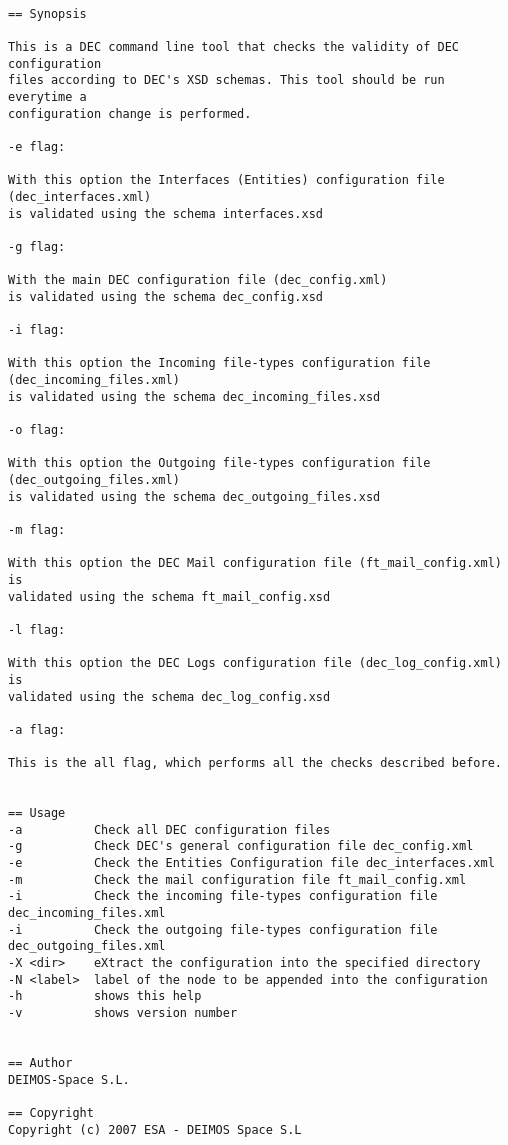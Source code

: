 \documentclass[dec_sum_main.tex]{subfiles}
\begin{document}
\begin{verbatim}

== Synopsis
	
This is a DEC command line tool that checks the validity of DEC configuration
files according to DEC's XSD schemas. This tool should be run everytime a 
configuration change is performed.

-e flag:

With this option the Interfaces (Entities) configuration file (dec_interfaces.xml)
is validated using the schema interfaces.xsd

-g flag:

With the main DEC configuration file (dec_config.xml)
is validated using the schema dec_config.xsd

-i flag:

With this option the Incoming file-types configuration file (dec_incoming_files.xml)
is validated using the schema dec_incoming_files.xsd

-o flag:

With this option the Outgoing file-types configuration file (dec_outgoing_files.xml)
is validated using the schema dec_outgoing_files.xsd

-m flag:

With this option the DEC Mail configuration file (ft_mail_config.xml) is
validated using the schema ft_mail_config.xsd

-l flag:

With this option the DEC Logs configuration file (dec_log_config.xml) is
validated using the schema dec_log_config.xsd

-a flag:

This is the all flag, which performs all the checks described before.


== Usage
-a          Check all DEC configuration files
-g          Check DEC's general configuration file dec_config.xml
-e          Check the Entities Configuration file dec_interfaces.xml
-m          Check the mail configuration file ft_mail_config.xml
-i          Check the incoming file-types configuration file dec_incoming_files.xml
-i          Check the outgoing file-types configuration file dec_outgoing_files.xml
-X <dir>    eXtract the configuration into the specified directory
-N <label>  label of the node to be appended into the configuration
-h          shows this help
-v          shows version number


== Author
DEIMOS-Space S.L.

== Copyright
Copyright (c) 2007 ESA - DEIMOS Space S.L
	
\end{verbatim}
\end{document}

